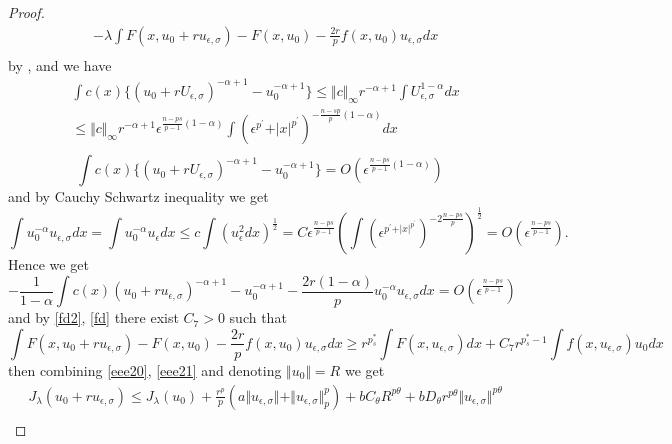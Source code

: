 \documentclass[10pt,twoside,reqno,centertags,draft]{amsart}
\begin{document}
\begin{proof}
\begin{equation}
\begin{aligned}
& -\lambda\int F(x,u_0 +ru_{\epsilon,\sigma}) -F(x,u_0) -\frac{2r}{p}f(x, u_0)u_{\epsilon,\sigma} dx\\
\end{aligned}
\end{equation}
by \cite{sun2011exact}, \cite{fiscella2019nehari} and \cite{mosconi2016brezis} we have
\begin{equation*}
\begin{aligned}
&\int c(x)\{(u_0 +rU_{\epsilon,\sigma})^{-\alpha+1} -u_0^{-\alpha +1}\} \leq \Vert c\Vert_{\infty}r^{-\alpha +1}  \int U_{\epsilon,\sigma}^{1 -\alpha}dx\\ 
&\leq  \Vert c\Vert_{\infty}r^{-\alpha +1} \epsilon^{\frac{n -ps}{p -1}(1 -\alpha)} \int 
\left( \epsilon^{p^{\prime}} +\vert x\vert^{p^{\prime}}\right)^{-\frac{n -sp}{p}(1 -\alpha)}dx \\
\end{aligned}
\end{equation*}
\begin{equation*}
\int c(x)\{(u_0 +rU_{\epsilon,\sigma})^{-\alpha+1} -u_0^{-\alpha +1}\} =O(\epsilon^{\frac{n -ps}{p -1}(1 -\alpha)})
\end{equation*}
and by Cauchy Schwartz inequality we get 
{\scriptsize
\begin{equation*}
\int u_0^{-\alpha}u_{\epsilon,\sigma}dx =\int u_0^{-\alpha}u_{\epsilon}dx \leq c\int \left( u_{\epsilon}^{2}dx\right)^{\frac{1}{2}} = C \epsilon^{\frac{n -ps}{p -1}}\left( \int \left( \epsilon^{p^{\prime} +\vert x\vert^{p^{\prime}}}\right)^{-2\frac{n -ps}{p}}\right)^{\frac{1}{2}} =O(\epsilon^{\frac{n -ps}{p -1}}).
\end{equation*}
}
Hence we get
\begin{equation}\label{eee21}
-\frac{1}{1 -\alpha}\int c(x)(u_0 +ru_{\epsilon,\sigma})^{-\alpha+1} -u_0^{-\alpha +1} -\frac{2r(1 -\alpha)}{p}u_0^{-\alpha}u_{\epsilon,\sigma}dx =O(\epsilon^{\frac{n -ps}{p -1}})
\end{equation}
and by \ref{fd2}, \ref{fd} there exist $ C_{7} >0$ such that
\begin{equation*}
\int F(x,u_0 +ru_{\epsilon,\sigma}) -F(x,u_0) -\frac{2r}{p}f(x, u_0)u_{\epsilon,\sigma} dx \geq r^{p_s^*}\int F(x,u_{\epsilon,\sigma})dx +C_{7} r^{p_s^* -1}\int f(x, u_{\epsilon,\sigma})u_0 dx
\end{equation*}
then combining \ref{eee20}, \ref{eee21} and denoting $ \Vert u_0\Vert =R$ we get
\begin{equation}\label{eee50}
\begin{aligned}
& J_{\lambda}(u_0 +ru_{\epsilon,\sigma})\leq J_{\lambda}(u_0)+\frac{r^{p}}{p}\left( a\Vert u_{\epsilon,\sigma}\Vert +\Vert u_{\epsilon,\sigma}\Vert^{p}_{p}\right) +bC_{\theta}R^{p\theta} +b D_{\theta} r^{p\theta}\Vert u_{\epsilon,\sigma}\Vert^{p\theta}\\

\end{aligned}
\end{equation}
\end{proof}
\end{document}
